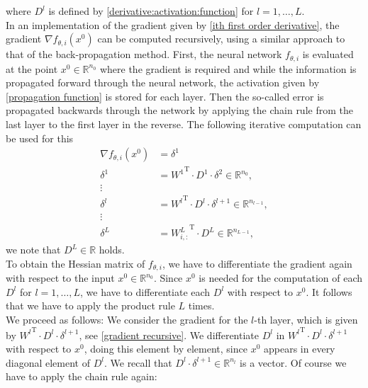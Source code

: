 where $D^l$ is defined by \cref{derivative:activation:function} for $l = 1, \ldots, L$. \\
In an implementation of the gradient given by \cref{ith first order derivative}, the gradient $\nabla f_{\theta, i} \left(x^0\right)$ can be computed recursively, using a similar approach to that of the back-propagation method. First, the neural network $f_{\theta, i}$ is evaluated at the point $x^0 \in \mathbb{R}^{n_0}$ where the gradient is required and while the information is propagated forward through the neural network, the activation given by \cref{propagation function} is stored for each layer. Then the so-called error is propagated backwards through the network by applying the chain rule from the last layer to the first layer in the reverse. The following iterative computation can be used for this
\begin{align}
    \label{gradient recursive}
    \nabla f_{\theta, i} \left(x^0\right) & = \delta^1 \\
    \delta^1 & = {W^{1}}^{\mathrm{T}} \cdot D^{1} \cdot \delta^2 \in \mathbb{R}^{n_0}, \\
    \vdots & \\
    \delta^l & = {W^{l}}^{\mathrm{T}} \cdot D^{l} \cdot \delta^{l+1} \in \mathbb{R}^{n_{l-1}}, \\
    \vdots & \\
    \delta^{L} & = {W^L_{i,:}}^{\mathrm{T}} \cdot D^{L} \in \mathbb{R}^{n_{L-1}},
\end{align}
we note that $D^{L} \in \mathbb{R}$ holds. \\
To obtain the Hessian matrix of $f_{\theta, i}$, we have to differentiate the gradient again with respect to the input $x^0 \in \mathbb{R}^{n_0}$. Since $x^0$ is needed for the computation of each $D^l$ for $l = 1, \ldots, L$, we have to differentiate each $D^l$ with respect to $x^0$. It follows that we have to apply the product rule $L$ times. \\
We proceed as follows: We consider the gradient for the $l$-th layer, which is given by ${W^{l}}^{\mathrm{T}} \cdot D^{l} \cdot \delta^{l+1}$, see \cref{gradient recursive}. We differentiate $D^{l}$ in ${W^{l}}^{\mathrm{T}} \cdot D^{l} \cdot \delta^{l+1}$ with respect to $x^0$, doing this element by element, since $x^0$ appears in every diagonal element of $D^{l}$. We recall that $D^{l} \cdot \delta^{l+1} \in \mathbb{R}^{n_l}$ is a vector. Of course we have to apply the chain rule again:
